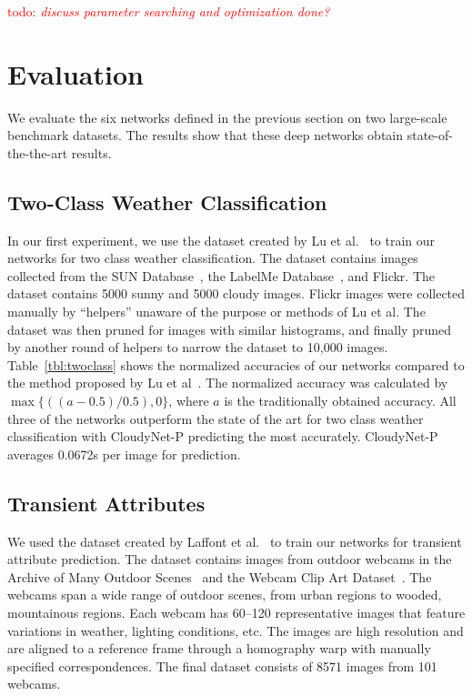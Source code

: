 \documentclass[10pt,twocolumn,letterpaper]{article}
\newcommand{\todo}[1]{\textcolor{red}{todo: {\em #1}}}
\newcommand{\tblref}[1]{Table~\ref{tbl:#1}}
\begin{document}
\todo{discuss parameter searching and optimization done?}

\section{Evaluation}
\indent
We evaluate the six networks defined in the previous section on two large-scale
benchmark datasets. The results show that these deep networks obtain
state-of-the-the-art results. 

\subsection{Two-Class Weather Classification}
\indent
In our first experiment, we use the dataset created by Lu et
al.~\cite{lutwoclass} to train our networks for two class weather
classification.  The dataset contains images collected from the SUN
Database~\cite{xiaoSUN}, the LabelMe Database~\cite{russell2008labelme}, and
Flickr. The dataset contains 5000 sunny and 5000 cloudy images. Flickr images
were collected manually by ``helpers'' unaware of the purpose or methods of Lu
et al. The dataset was then pruned for images with similar histograms, and
finally pruned by another round of helpers to narrow the dataset to 10,000
images.  \tblref{twoclass} shows the normalized accuracies of our networks
compared to the method proposed by Lu et al~\cite{lutwoclass}.  The normalized
accuracy was calculated by $ \max\{((a - 0.5) / 0.5), 0\} $, where $a$ is the
traditionally obtained accuracy. All three of the networks outperform the state
of the art for two class weather classification with CloudyNet-P predicting the
most accurately.  CloudyNet-P averages 0.0672s per image for prediction. 

\subsection{Transient Attributes}
\indent
We used the dataset created by Laffont et al.~\cite{Laffont14} to train our
networks for transient attribute prediction. The dataset contains images from
outdoor webcams in the Archive of Many Outdoor Scenes~\cite{jacobs07amos} and
the Webcam Clip Art Dataset~\cite{lalondesig09}.  The webcams span a wide range
of outdoor scenes, from urban regions to wooded, mountainous regions. Each
webcam has 60--120 representative images that feature variations in weather,
lighting conditions, etc.  The images are high resolution and are aligned to a
reference frame through a homography warp with manually specified
correspondences.  The final dataset consists of 8571 images from 101 webcams.
\end{document}

